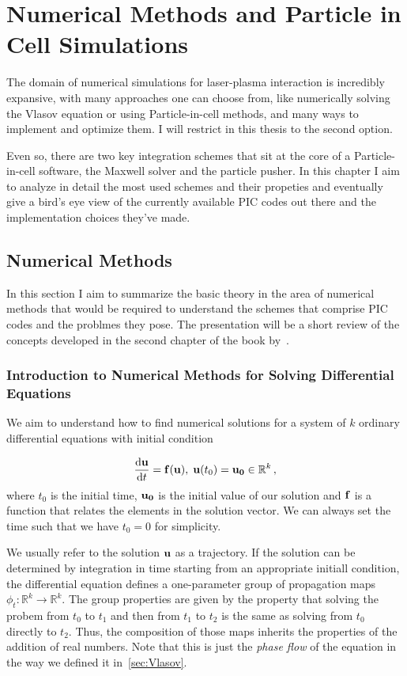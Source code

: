 \documentclass[12pt, class=report, crop=false]{standalone}
\begin{document}
\chapter{Numerical Methods and Particle in Cell Simulations}%
\label{chap:numerical-methods}

The domain of numerical simulations for laser-plasma interaction is incredibly expansive, with many approaches one can choose from, like numerically solving the Vlasov equation or using Particle-in-cell methods, and many ways to implement and optimize them. I will restrict in this thesis to the second option.

Even so, there are two key integration schemes that sit at the core of a Particle-in-cell software, the Maxwell solver and the particle pusher. In this chapter I aim to analyze in detail the most used schemes and their propeties and eventually give a bird's eye view of the currently available PIC codes out there and the implementation choices they've made.

\section{Numerical Methods}

In this section I aim to summarize the basic theory in the area of numerical methods that would be required to understand the schemes that comprise PIC codes and the problmes they pose. The presentation will be a short review of the concepts developed in the second chapter of the book by~\cite{leimkuhlerSimulatingHamiltonianDynamics2004}.

\subsection{Introduction to Numerical Methods for Solving Differential Equations}

We aim to understand how to find numerical solutions for a system of \(k\) ordinary differential equations with initial condition

\begin{equation}
  \label{eq:ODE}
  \dv{\vb{u}}{t} = \vb{f}(\vb{u}),\; \vb{u}(t_0) = \vb{u_0} \in \mathbb{R}^k\,,
\end{equation}
where \(t_0\) is the initial time, \(\vb{u_0}\) is the initial value of our solution and \(\vb{f}\) is a function that relates the elements in the solution vector. We can always set the time such that we have \(t_0=0\) for simplicity.

We usually refer to the solution \(\vb{u}\) as a trajectory. If the solution can be determined by integration in time starting from an appropriate initiall condition, the differential equation defines a one-parameter group of propagation maps \(\phi_t:\mathbb{R}^k \rightarrow \mathbb{R}^k\). The group properties are given by the property that solving the probem from \(t_0\) to \(t_1\) and then from \(t_1\) to \(t_2\) is the same as solving from \(t_0\) directly to \(t_2\). Thus, the composition of those maps inherits the properties of the addition of real numbers. Note that this is just the \textit{phase flow} of the equation in the way we defined it in~\cref{sec:Vlasov}.
\end{document}
